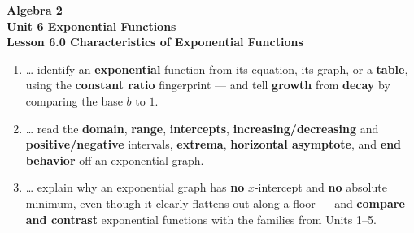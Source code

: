 \documentclass[10pt]{article}
\begin{document}
\vspace{-0.8in}

\begin{center}
  {\color{white}\textbf{\LARGE Algebra 2}}\\[4pt]
  {\color{forestmid}\large\textbf{Unit 6 \quad Exponential Functions}}\\[6pt]
  {\color{white}\textbf{\large Lesson 6.0 \quad Characteristics of Exponential Functions}}
\end{center}

\vspace{0.22in}
\namedateperiod
\vspace{0.18in}

\begin{learningtargetbox}
\small
\begin{enumerate}[leftmargin=1.5em, itemsep=5pt]
  \item \ldots{} identify an \textbf{exponential} function from its equation, its graph, or a \textbf{table}, using the \textbf{constant ratio} fingerprint --- and tell \textbf{growth} from \textbf{decay} by comparing the base $b$ to $1$.
  \item \ldots{} read the \textbf{domain}, \textbf{range}, \textbf{intercepts}, \textbf{increasing/decreasing} and \textbf{positive/negative} intervals, \textbf{extrema}, \textbf{horizontal asymptote}, and \textbf{end behavior} off an exponential graph.
  \item \ldots{} explain why an exponential graph has \textbf{no} $x$-intercept and \textbf{no} absolute minimum, even though it clearly flattens out along a floor --- and \textbf{compare and contrast} exponential functions with the families from Units 1--5.
\end{enumerate}
\end{learningtargetbox}

\vspace{0.14in}
\end{document}

